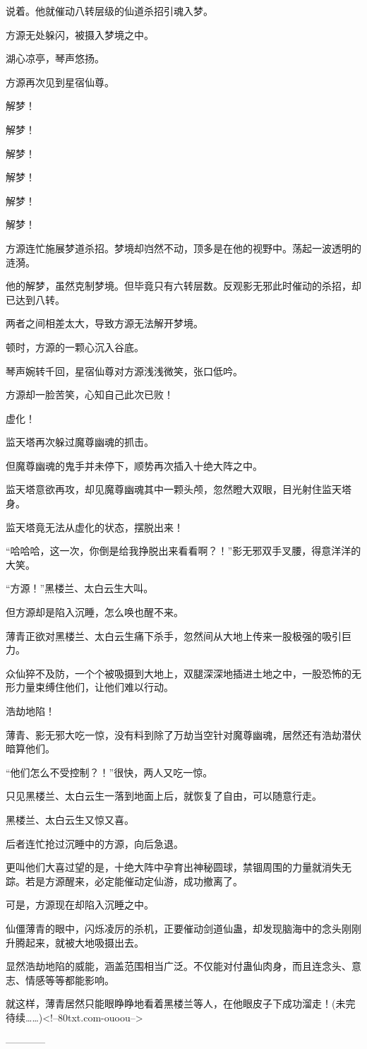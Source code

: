 \begin{this_body}
说着。他就催动八转层级的仙道杀招引魂入梦。

方源无处躲闪，被摄入梦境之中。

湖心凉亭，琴声悠扬。

方源再次见到星宿仙尊。

解梦！

解梦！

解梦！

解梦！

解梦！

解梦！

方源连忙施展梦道杀招。梦境却岿然不动，顶多是在他的视野中。荡起一波透明的涟漪。

他的解梦，虽然克制梦境。但毕竟只有六转层数。反观影无邪此时催动的杀招，却已达到八转。

两者之间相差太大，导致方源无法解开梦境。

顿时，方源的一颗心沉入谷底。

琴声婉转千回，星宿仙尊对方源浅浅微笑，张口低吟。

方源却一脸苦笑，心知自己此次已败！

虚化！

监天塔再次躲过魔尊幽魂的抓击。

但魔尊幽魂的鬼手并未停下，顺势再次插入十绝大阵之中。

监天塔意欲再攻，却见魔尊幽魂其中一颗头颅，忽然瞪大双眼，目光射住监天塔身。

监天塔竟无法从虚化的状态，摆脱出来！

“哈哈哈，这一次，你倒是给我挣脱出来看看啊？！”影无邪双手叉腰，得意洋洋的大笑。

“方源！”黑楼兰、太白云生大叫。

但方源却是陷入沉睡，怎么唤也醒不来。

薄青正欲对黑楼兰、太白云生痛下杀手，忽然间从大地上传来一股极强的吸引巨力。

众仙猝不及防，一个个被吸摄到大地上，双腿深深地插进土地之中，一股恐怖的无形力量束缚住他们，让他们难以行动。

浩劫地陷！

薄青、影无邪大吃一惊，没有料到除了万劫当空针对魔尊幽魂，居然还有浩劫潜伏暗算他们。

“他们怎么不受控制？！”很快，两人又吃一惊。

只见黑楼兰、太白云生一落到地面上后，就恢复了自由，可以随意行走。

黑楼兰、太白云生又惊又喜。

后者连忙抢过沉睡中的方源，向后急退。

更叫他们大喜过望的是，十绝大阵中孕育出神秘圆球，禁锢周围的力量就消失无踪。若是方源醒来，必定能催动定仙游，成功撤离了。

可是，方源现在却陷入沉睡之中。

仙僵薄青的眼中，闪烁凌厉的杀机，正要催动剑道仙蛊，却发现脑海中的念头刚刚升腾起来，就被大地吸摄出去。

显然浩劫地陷的威能，涵盖范围相当广泛。不仅能对付蛊仙肉身，而且连念头、意志、情感等等都能影响。

就这样，薄青居然只能眼睁睁地看着黑楼兰等人，在他眼皮子下成功溜走！(未完待续……)<!--80txt.com-ouoou-->

------------

\end{this_body}

